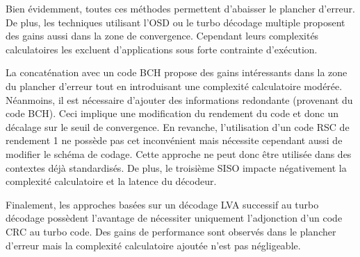 Bien évidemment, toutes ces méthodes permettent d'abaisser le plancher d'erreur. De plus, les techniques utilisant l'OSD 
ou le turbo décodage multiple proposent des gains aussi dans la zone de convergence. Cependant leurs complexités calculatoires 
les excluent d'applications sous forte contrainte d'exécution. 

La concaténation avec un code BCH propose des gains intéressants dans la zone du plancher d'erreur tout en introduisant une
complexité calculatoire modérée. Néanmoins, il est nécessaire d'ajouter des informations redondante (provenant du code BCH). 
Ceci implique une modification du rendement du code et donc un décalage sur le seuil de convergence. 
En revanche, l'utilisation d'un code RSC de rendement 1 ne possède pas cet inconvénient mais nécessite cependant aussi de 
modifier le schéma de codage. Cette approche ne peut donc être utilisée dans des contextes déjà standardisés. De plus, le 
troisième SISO impacte négativement la complexité calculatoire et la latence du décodeur.

Finalement, les approches basées sur un décodage LVA successif au turbo décodage possèdent l'avantage de nécessiter uniquement 
l'adjonction d'un code CRC au turbo code. Des gains de performance sont observés dans le plancher d'erreur mais la complexité 
calculatoire ajoutée n'est pas négligeable.

\begin{table}[tb]
\centering
\caption{Synthèse des différentes méthodes améliorant les performances de décodage}
\label{tab:recap}
\end{table}

